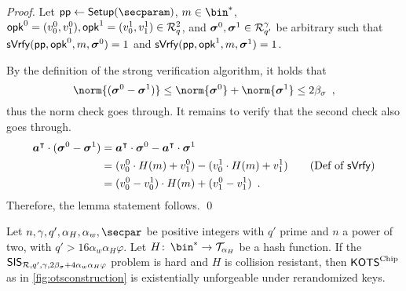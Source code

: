 \begin{proof}
  Let $\params\gets\setup(\secparam)$, $m\in\bin^*$, $\mathsf{opk}^0=(v^0_0,v^0_1),\mathsf{opk}^1=(v^1_0,v^1_1)\in \mathcal{R}^2_q$, and $\boldsymbol{\sigma}^0,\boldsymbol{\sigma}^1 \in \mathcal{R}_{q'}^\gamma$ be arbitrary such that $\mathsf{sVrfy}(\mathsf{pp},\mathsf{opk}^0,m,\boldsymbol{\sigma}^0)=1$ and $\mathsf{sVrfy}(\mathsf{pp},\mathsf{opk}^1,m,\boldsymbol{\sigma}^1)=1$.
  
  By the definition of the strong verification algorithm, it holds that
  \begin{equation*}
     \norm{(\vec{\sigma}^0-\vec{\sigma}^1)}
    \leq \norm{\vec{\sigma}^0}+\norm{\vec{\sigma}^1}
    \leq 2\beta_\sigma\enspace,
  \end{equation*}
  thus the norm check goes through.
  It remains to verify that the second check also goes through.
  \begin{align*}
     \vec{a}^\transpose\cdot (\vec{\sigma}^0-\vec{\sigma}^1)
    ={}& \vec{a}^\transpose\cdot \vec{\sigma}^0- \vec{a}^\transpose\cdot\vec{\sigma}^1\\
    ={}& (v^0_0\cdot H(m) + v^0_1) - (v^1_0\cdot H(m) + v^1_1)\tag{Def of $\sverify$}\\
    ={}& (v^0_0-v^1_0)\cdot H(m) + (v^0_1-v^1_1)\enspace.
  \end{align*}
  Therefore, the lemma statement follows.
  \qed
\end{proof}


\begin{lemma}\label{lem:kots_sis}
  Let $n,\otspkkeylen,q',\alpha_H,\alpha_w,\secpar$ be positive integers with $q'$ prime and $n$ a power of two, with $q' > 16 \alpha_w \alpha_H\varphi$.
  Let $H\colon\, \bin^* \to \tern_{\alpha_H}$ be a hash function.
  If the $\mathsf{SIS}_{\mathcal{R},q',\gamma,2\beta_\sigma + 4\alpha_w\alpha_H\varphi}$ problem is hard and $H$ is collision resistant, then $\mathsf{KOTS}^{\textup{Chip}}$ as in \autoref{fig:otsconstruction} is existentially unforgeable under rerandomized keys.
\end{lemma}

